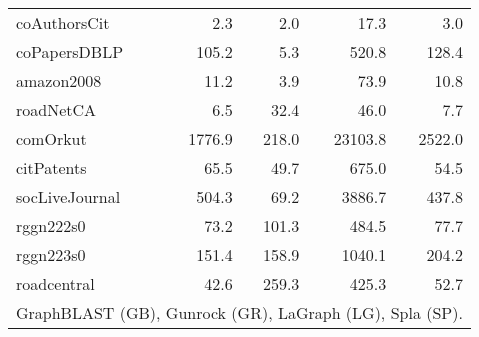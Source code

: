 \begin{table}[tbp]
\begin{center}
\begin{tabular}{|l|r|r|r|r|}
        \hline
        \rowcolor{black!10} coAuthorsCit&2.3&2.0&17.3&3.0\\
        \rowcolor{black!2 } coPapersDBLP&105.2&5.3&520.8&128.4\\
        \rowcolor{black!10} amazon2008&11.2&3.9&73.9&10.8\\
        \rowcolor{black!2 } roadNetCA&6.5&32.4&46.0&7.7\\
        \rowcolor{black!10} comOrkut&1776.9&218.0&23103.8&2522.0\\
        \rowcolor{black!2 } citPatents&65.5&49.7&675.0&54.5\\
        \rowcolor{black!10} socLiveJournal&504.3&69.2&3886.7&437.8\\
        \rowcolor{black!2 } rggn222s0&73.2&101.3&484.5&77.7\\
        \rowcolor{black!10} rggn223s0&151.4&158.9&1040.1&204.2\\
        \rowcolor{black!2 } roadcentral&42.6&259.3&425.3&52.7\\
        \hline
        \hline
        \multicolumn{5}{l}{GraphBLAST (GB), Gunrock (GR), LaGraph (LG), Spla (SP).} \\
        \end{tabular}
        \label{rq1_table}
    \end{center}
    \end{table}
    
